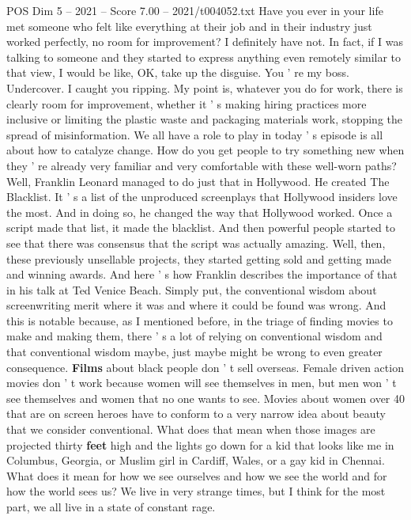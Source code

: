 \begin{textsample}{POS Dim 5 – 2021 – Score 7.00 – 2021/t004052.txt}  \label{ex:f5_pos_074}
Have you ever in your life met someone who felt like everything at their job and in their industry just worked perfectly, no room for improvement?
I definitely have not.
In fact, if I was talking to someone and they started to express anything even remotely similar to that view, I would be like, OK, take up the disguise.
You ' re my boss.
Undercover.
I caught you ripping.
My point is, whatever you do for work, there is clearly room for improvement, whether it ' s making hiring practices more inclusive or limiting the plastic waste and packaging materials work, stopping the spread of misinformation.
We all have a role to play in today ' s episode is all about how to catalyze change.
How do you get people to try something new when they ' re already very familiar and very comfortable with these well-worn paths?
Well, Franklin Leonard managed to do just that in Hollywood.
He created The Blacklist.
It ' s a list of the unproduced screenplays that Hollywood insiders love the most.
And in doing so, he changed the way that Hollywood worked.
Once a script made that list, it made the blacklist.
And then powerful people started to see that there was consensus that the script was actually amazing.
Well, then, these previously unsellable projects, they started getting sold and getting made and winning awards.
And here ' s how Franklin describes the importance of that in his talk at Ted Venice Beach.
Simply put, the conventional wisdom about screenwriting merit where it was and where it could be found was wrong.
And this is notable because, as I mentioned before, in the triage of finding movies to make and making them, there ' s a lot of relying on conventional wisdom and that conventional wisdom maybe, just maybe might be wrong to even greater consequence. \textbf{Films} about black people don ' t sell overseas.
Female driven action movies don ' t work because women will see themselves in men, but men won ' t see themselves and women that no one wants to see.
Movies about women over 40 that are on screen heroes have to conform to a very narrow idea about beauty that we consider conventional.
What does that mean when those images are projected thirty \textbf{feet} high and the lights go down for a kid that looks like me in Columbus, Georgia, or Muslim girl in Cardiff, Wales, or a gay kid in Chennai.
What does it mean for how we see ourselves and how we see the world and for how the world sees us?
We live in very strange times, but I think for the most part, we all live in a state of constant rage.

\end{textsample}
